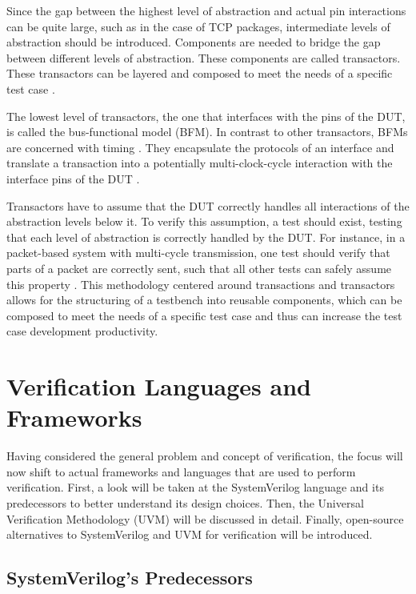 Since the gap between the highest level of abstraction and actual pin interactions can be quite large, such as in the case of TCP packages, intermediate levels of abstraction should be introduced. Components are needed to bridge the gap between different levels of
abstraction. These components are called transactors. These transactors can
be layered and composed to meet the needs of a specific test case \cite[Ch. 4]{bergeron2012writing}.

The lowest level of transactors, the one that interfaces with the pins of the DUT, is called the bus-functional model (BFM). In
contrast to other transactors, BFMs are concerned with timing \cite[Ch. 4]{bergeron2012writing}. They encapsulate the
protocols of an interface and translate a transaction into a potentially multi-clock-cycle interaction with the
interface pins of the DUT \cite[Ch. 3]{salemi2013uvm}.

Transactors have to assume that the DUT correctly handles all interactions of the abstraction levels below it. To verify this assumption, a
test should exist, testing that each level of abstraction is correctly handled by the DUT. For instance, in a
packet-based system with multi-cycle transmission, one test should verify that parts of a packet are correctly sent,
such that all other tests can safely assume this property \cite[Ch. 6]{bergeron2012writing}. This methodology centered
around transactions and transactors allows for the structuring of a testbench into reusable components, which can be
composed to meet the needs of a specific test case and thus can increase the test case development productivity.

\section{Verification Languages and Frameworks} %

Having considered the general problem and concept of verification, the focus will now shift to actual frameworks and
languages that are used to perform verification. First, a look will be taken at the SystemVerilog language and
its predecessors to better understand its design choices. Then, the Universal Verification Methodology (UVM) will be
discussed in detail. Finally, open-source alternatives to SystemVerilog and UVM for verification will be introduced.

\subsection{SystemVerilog's Predecessors} %

